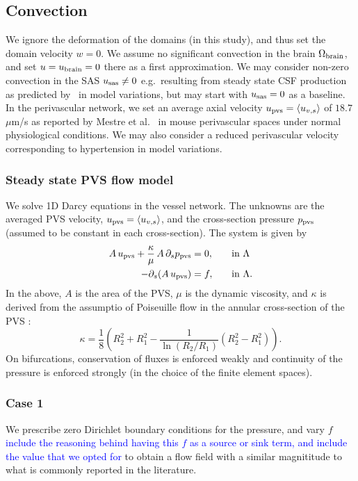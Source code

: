 \documentclass[fleqn,10pt]{wlscirep}
\newcommand{\rami}[1]{\textcolor{blue}{#1}}
\begin{document}
 \subsection*{Convection}
We ignore the deformation of the domains (in this study), and thus set the domain velocity $w = 0$. We assume no significant convection in the brain $\Omega_{\rm brain}$, and set $u = u_{\rm brain} = 0$ there as a first approximation. We may consider non-zero convection in the SAS $u_{\rm sas} \not = 0$ e.g.~resulting from steady state CSF production as predicted by~\cite{hornkjol2022csf} in model variations, but may start with $u_{\rm sas} = 0$ as a baseline. In the perivascular network, we set an average axial velocity $u_{\rm pvs} = \langle u_{v, s} \rangle$ of $18.7$ $\mu$m/s as reported by Mestre et al.~\cite{mestre2018flow} in mouse perivascular spaces under normal physiological conditions. We may also consider a reduced perivascular velocity corresponding to hypertension in model variations.
\subsubsection*{Steady state PVS flow model} We solve 1D Darcy equations in the vessel network. The unknowns are the averaged PVS velocity, $u_{\rm pvs} = \langle u_{v,s} \rangle$, and the cross-section pressure $p_{\rm pvs} $ (assumed to be constant in each cross-section). The system is given by  \cite{daversin2022geometrically} 
\begin{alignat}{2}
A \,  u_{\rm pvs}   + \frac{\kappa}{\mu} \, A \, \partial_{s} p_{\rm pvs} & = 0, &&  \quad \rm in  \,\, \Lambda  \\ 
-\partial_s (A \, u_{\rm pvs}) & = f, && \quad \rm in  \,\, \Lambda .  
\end{alignat} 
In the above, $A$ is the area of the PVS, $\mu$ is the dynamic viscosity, and $\kappa$ is derived from the assumptio of Poiseuille
flow in the annular cross-section of the PVS \cite{daversin2022geometrically,tithof2022network}: 
\begin{equation}
\kappa = \frac18 \left( R_2^2 + R_1^2 - \frac{1}{\ln(R_2/R_1)} (R_2^2- R_1^2) \right). 
\end{equation}
On bifurcations, conservation of fluxes is enforced weakly and continuity of the pressure is enforced strongly (in the choice of the finite element spaces). 

\subsubsection*{Case 1} We prescribe zero Dirichlet boundary conditions for the pressure, and vary $f$ \rami{include the reasoning behind having this $f$ as a source or sink term, and include the value that we opted for} to obtain a flow field with a similar magnititude to what is commonly reported in the literature.  
\end{document}
